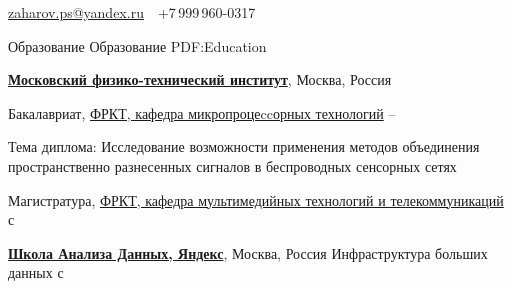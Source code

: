 \documentclass[a4paper, MMyyyy,nonstopmode]{simpleresumecv}
\newcommand{\CVAuthor}{Павел Захаров}
\begin{document}

\Title{\CVAuthor}

\begin{SubTitle}
\href{paltoszaharov@yandex.ru}
{zaharov.ps@yandex.ru}
\,\SubBulletSymbol\,
+7\,999\,960-0317
\end{SubTitle}

\begin{Body}


\Section
{Образование}
{Образование}
{PDF:Education}

\Entry
\href{https://mipt.ru/}
{\textbf{Московский физико-технический институт}},
Москва, Россия

\Gap
\BulletItem
Бакалавриат, 
\href{https://mipt.ru/education/chairs/microprocessors/}
{ФРКТ, кафедра микропроцеccорных технологий}
\hfill
{} --
\begin{Detail}
\SubBulletItem
Тема диплома: Исследование возможности применения методов
объединения пространственно разнесенных сигналов
в беспроводных сенсорных сетях
\end{Detail}

\BulletItem
Магистратура, 
\href{https://mipt.ru/drec/about/bases/multimedia_technology_and_telecommunications/}
{ФРКТ, кафедра мультимедийных технологий и телекоммуникаций}
\hfill
с 

\Gap

\Entry
\href{https://yandexdataschool.ru/}
{\textbf{Школа Анализа Данных, Яндекс}},
Москва, Россия
\Gap
\BulletItem
Инфраструктура больших данных
\hfill
с 
%


\end{Body}
\end{document}
